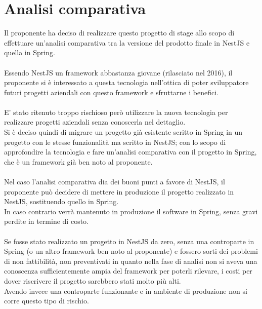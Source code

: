 
\chapter{Analisi comparativa}
\label{cap:analisi-comparativa}

Il proponente ha deciso di realizzare questo progetto di stage allo scopo di effettuare 
un'analisi comparativa tra la versione del prodotto finale in NestJS e quella in Spring.
\\\\
Essendo NestJS un framework abbastanza giovane (rilasciato nel 2016), il proponente si 
è interessato a questa tecnologia nell'ottica di poter sviluppatore futuri progetti 
aziendali con questo framework e sfruttarne i benefici.
\\\\
E' stato ritenuto troppo rischioso però utilizzare la nuova tecnologia per realizzare
progetti aziendali senza conoscerla nel dettaglio. 
\\
Si è deciso quindi di migrare un progetto già 
esistente scritto in Spring in un progetto con le stesse funzionalità ma scritto in NestJS; con 
lo scopo di approfondire la tecnologia e fare un'analisi comparativa
con il progetto in Spring, che è un framework già ben noto al proponente.
\\\\
Nel caso l'analisi comparativa dia dei buoni punti a favore di NestJS, il proponente può 
decidere di mettere in produzione il progetto realizzato in NestJS, sostituendo quello
in Spring.
\\
In caso contrario verrà mantenuto in produzione il software in Spring, senza gravi perdite in termine 
di costo.
\\\\
Se fosse stato realizzato un progetto in NestJS da zero, senza una controparte in Spring (o un altro framework ben noto al proponente)
e fossero sorti dei problemi di non fattibilità, non preventivati in quanto nella fase di analisi 
non si aveva una conoscenza sufficientemente ampia del framework per poterli rilevare, i
costi per dover riscrivere il progetto sarebbero stati molto più alti.
\\
Avendo invece una controparte funzionante e in ambiente di produzione non si corre questo tipo di rischio.


